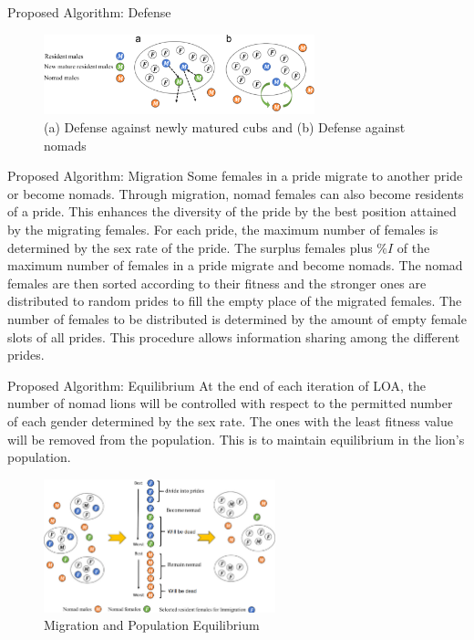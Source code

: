 \documentclass{beamer}
\begin{document}
\begin{frame}{Proposed Algorithm: Defense}
\begin{figure}[H]
\begin{center}
\includegraphics[width=0.7\textwidth]{img/defense/defense}
\caption{(a) Defense against newly matured cubs and (b) Defense against nomads}
\end{center}
\end{figure}
\end{frame}


\begin{frame}{Proposed Algorithm: Migration}
Some females in a pride migrate to another pride or become nomads. Through migration, nomad females can also become residents of a pride. This enhances the diversity of the pride by the best position attained by the migrating females. For each pride, the maximum number of females is determined by the sex rate of the pride. The surplus females plus $\%I$ of the maximum number of females in a pride migrate and become nomads. The nomad females are then sorted according to their fitness and the stronger ones are distributed to random prides to fill the empty place of the migrated females. The number of females to be distributed is determined by the amount of empty female slots of all prides. This procedure allows information sharing among the different prides.
\end{frame}

\begin{frame}{Proposed Algorithm: Equilibrium}
\small
At the end of each iteration of LOA, the number of nomad lions will be controlled with respect to the permitted number of each gender determined by the sex rate. The ones with the least fitness value will be removed from the population. This is to maintain equilibrium in the lion's population.
\normalsize
\begin{figure}[H]
\begin{center}
\includegraphics[width=0.6\textwidth]{img/equilibrium/equilibrium}
\caption{Migration and Population Equilibrium}
\end{center}
\end{figure}
\end{frame}
\end{document}
